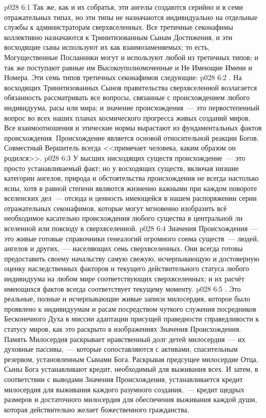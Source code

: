 \vs p028 6:1 Так же, как и их собратья, эти ангелы создаются серийно и в семи отражательных типах, но эти типы не назначаются индивидуально на отдельные службы к администраторам сверхвселенных. Все третичные секонафимы коллективно назначаются к Тринитизованным Сынам Достижения, и эти восходящие сыны используют их как взаимозаменяемых; то есть, Могущественные Посланники могут и используют любой из третичных типов; и так же поступают равные им Высокоуполномоченные и Не Имеющие Имени и Номера. Эти семь типов третичных секонафимов следующие:
\vs p028 6:2 . На восходящих Тринитизованных Сынов правительства сверхвселенной возлагается обязанность рассматривать все вопросы, связанные с происхождением любого индивидуума, расы или мира; и значение происхождения~--- это первостепенный вопрос во всех наших планах космического прогресса живых созданий миров. Все взаимоотношения и этические нормы вырастают из фундаментальных фактов происхождения. Происхождение является основой относительной реакции Богов. Совместный Вершитель всегда <<примечает человека, каким образом он родился>>.
\vs p028 6:3 У высших нисходящих существ происхождение~--- это просто устанавливаемый факт; но у восходящих существ, включая низшие категории ангелов, природа и обстоятельства происхождения не всегда настолько ясны, хотя в равной степени являются жизненно важными при каждом повороте вселенских дел~--- отсюда и ценность имеющейся в нашем распоряжении серии отражательных секонафимов, которые могут мгновенно изобразить всё необходимое касательно происхождения любого существа в центральной ли вселенной или повсюду в сверхвселенной.
\vs p028 6:4 Значения Происхождения~--- это живые готовые справочники генеалогий огромного сонма существ~--- людей, ангелов и других,~--- населяющих семь сверхвселенных. Они всегда готовы предоставить своему начальству самую свежую, исчерпывающую и достоверную оценку наследственных факторов и текущего действительного статуса любого индивидуума на любом мире соответствующих сверхвселенных; и их расчёт имеющихся фактов всегда соответствует текущему моменту.
\vs p028 6:5 . Это реальные, полные и исчерпывающие живые записи милосердия, которое было проявлено к индивидуумам и расам посредством чуткого служения посредников Бесконечного Духа в миссии адаптации присущей праведности справедливости к статусу миров, как это раскрыто в изображениях Значения Происхождения. Память Милосердия раскрывает нравственный долг детей милосердия~--- их духовные пассивы,~--- которые сопоставляются с активами, спасительным резервом, установленным Сынами Бога. Раскрывая предсущее милосердие Отца, Сыны Бога устанавливают кредит, необходимый для выживания всех. И затем, в соответствии с выводами Значения Происхождения, устанавливается кредит милосердия для выживания каждого разумного создания,~--- кредит щедрых размеров и достаточного милосердия для обеспечения выживания каждой души, которая действительно желает божественного гражданства.

